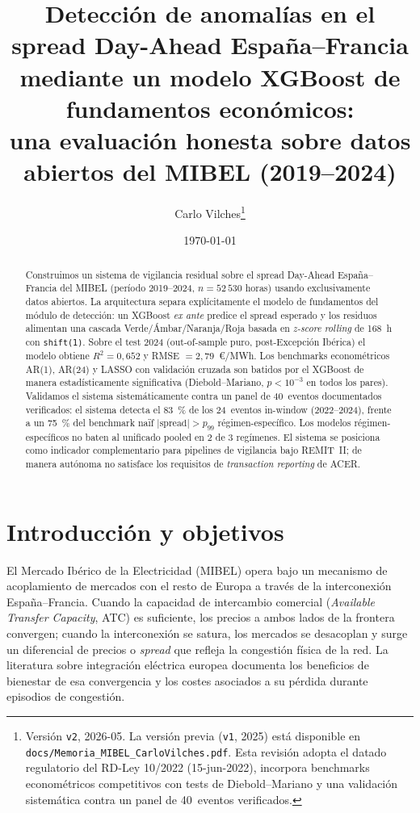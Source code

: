 \documentclass[11pt,a4paper]{article}
\title{\textbf{Detección de anomalías en el spread Day-Ahead España--Francia
mediante un modelo XGBoost de fundamentos económicos:\\
una evaluación honesta sobre datos abiertos del MIBEL (2019--2024)}}
\author{Carlo Vilches\thanks{Versión \texttt{v2}, 2026-05. La versión previa
(\texttt{v1}, 2025) está disponible en \texttt{docs/Memoria\_MIBEL\_CarloVilches.pdf}.
Esta revisión adopta el datado regulatorio del RD-Ley 10/2022 (15-jun-2022),
incorpora benchmarks econométricos competitivos con tests de Diebold--Mariano
y una validación sistemática contra un panel de 40~eventos verificados.}}
\date{\today}
\begin{document}
\maketitle

\begin{abstract}
\noindent
Construimos un sistema de vigilancia residual sobre el spread Day-Ahead
España--Francia del MIBEL (período 2019--2024, $n = 52\,530$ horas) usando
exclusivamente datos abiertos. La arquitectura separa explícitamente el
modelo de fundamentos del módulo de detección: un XGBoost \emph{ex ante}
predice el spread esperado y los residuos alimentan una cascada
Verde/Ámbar/Naranja/Roja basada en \emph{z-score} \emph{rolling} de 168~h
con \texttt{shift(1)}. Sobre el test 2024 (out-of-sample puro,
post-Excepción Ibérica) el modelo obtiene $R^2 = 0{,}652$ y
RMSE $= 2{,}79$~€/MWh. Los benchmarks econométricos AR(1), AR(24) y LASSO
con validación cruzada son batidos por el XGBoost de manera
estadísticamente significativa (Diebold--Mariano, $p < 10^{-3}$ en todos
los pares). Validamos el sistema sistemáticamente contra un panel de
40~eventos documentados verificados: el sistema detecta el 83~\% de los
24~eventos in-window (2022--2024), frente a un 75~\% del benchmark naïf
$|\text{spread}| > p_{99}$ régimen-específico. Los modelos
régimen-específicos no baten al unificado pooled en 2 de 3 regímenes.
El sistema se posiciona como indicador complementario para pipelines de
vigilancia bajo REMIT~II; de manera autónoma no satisface los requisitos
de \emph{transaction reporting} de ACER.
\end{abstract}

\section{Introducción y objetivos}

El Mercado Ibérico de la Electricidad (MIBEL) opera bajo un mecanismo de
acoplamiento de mercados con el resto de Europa a través de la
interconexión España--Francia. Cuando la capacidad de intercambio
comercial (\textit{Available Transfer Capacity}, ATC) es suficiente, los
precios a ambos lados de la frontera convergen; cuando la interconexión
se satura, los mercados se desacoplan y surge un diferencial de precios
o \emph{spread} que refleja la congestión física de la red. La
literatura sobre integración eléctrica europea \citep{Newbery2016}
documenta los beneficios de bienestar de esa convergencia y los costes
asociados a su pérdida durante episodios de congestión.
\end{document}
